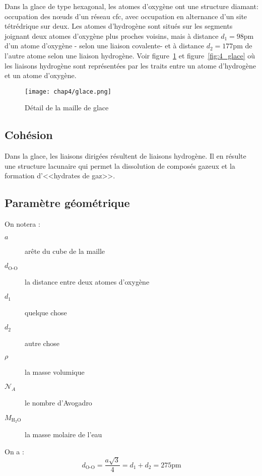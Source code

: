 Dans la glace de type hexagonal, les atomes d’oxygène
ont une structure diamant: occupation des nœuds d’un
réseau cfc, avec occupation en alternance d’un
site tétrédrique sur deux.
Les atomes d’hydrogène sont situés sur les segments
joignant deux atomes d’oxygène plus proches voisins,
mais à distance $d_1=98$pm d’un atome d’oxygène \-- selon
une liaison covalente\-- et à distance $d_2= 177$pm
de l’autre atome selon une liaison hydrogène.
Voir figure~\ref{fig:4_tétraèdre_glace} et
figure~\ref{fig:4_glace} où les liaisons hydrogène sont
représentées par les traits entre un atome d'hydrogène
et un atome d'oxygène.
\begin{figure}
    \centering
    \texttt{[image: chap4/glace.png]}
    \caption{Détail de la maille de glace}
    \label{fig:4_tétraèdre_glace}
\end{figure}

\subsection{Cohésion}
Dans la glace, les liaisons dirigées résultent de liaisons
hydrogène. Il en résulte une structure lacunaire qui permet
la dissolution de composés gazeux et la formation
d’<<hydrates de gaz>>.

\subsection{Paramètre géométrique}
On notera :
\begin{description}
    \item[$a$] arête du cube de la maille
    \item[$d_\text{O-O}$] la distance entre deux atomes
        d'oxygène
    \item[$d_1$] quelque chose
    \item[$d_2$] autre chose
    \item[$\rho$] la masse volumique
    \item[$\mathcal{N}_A$] le nombre d'Avogadro
    \item[$M_{\text{H}_2\text{O}}$] la masse molaire de
        l'eau
\end{description}
On a :
\begin{equation}
    d_\text{O-O} = \frac{a\sqrt{3}}{4} = d_1 + d_2
    = 275\text{pm}
\end{equation}

